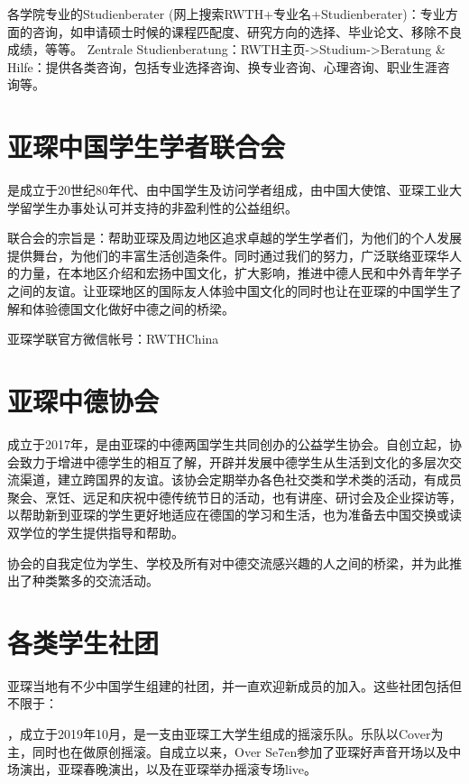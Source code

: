 各学院专业的Studienberater (网上搜索RWTH+专业名+Studienberater)：专业方面的咨询，如申请硕士时候的课程匹配度、研究方向的选择、毕业论文、移除不良成绩，等等。
Zentrale Studienberatung：RWTH主页->Studium->Beratung \& Hilfe：提供各类咨询，包括专业选择咨询、换专业咨询、心理咨询、职业生涯咨询等。

\section{亚琛中国学生学者联合会}

\href{http://www.vcwsa.rwth-aachen.de/}{}是成立于20世纪80年代、由中国学生及访问学者组成，由中国大使馆、亚琛工业大学留学生办事处认可并支持的非盈利性的公益组织。

联合会的宗旨是：帮助亚琛及周边地区追求卓越的学生学者们，为他们的个人发展提供舞台，为他们的丰富生活创造条件。同时通过我们的努力，广泛联络亚琛华人的力量，在本地区介绍和宏扬中国文化，扩大影响，推进中德人民和中外青年学子之间的友谊。让亚琛地区的国际友人体验中国文化的同时也让在亚琛的中国学生了解和体验德国文化做好中德之间的桥梁。

亚琛学联官方微信帐号：RWTHChina

\section{亚琛中德协会}

\href{https://www.cg-society.com/en/}{}成立于2017年，是由亚琛的中德两国学生共同创办的公益学生协会。自创立起，协会致力于增进中德学生的相互了解，开辟并发展中德学生从生活到文化的多层次交流渠道，建立跨国界的友谊。该协会定期举办各色社交类和学术类的活动，有成员聚会、烹饪、远足和庆祝中德传统节日的活动，也有讲座、研讨会及企业探访等，以帮助新到亚琛的学生更好地适应在德国的学习和生活，也为准备去中国交换或读双学位的学生提供指导和帮助。

协会的自我定位为学生、学校及所有对中德交流感兴趣的人之间的桥梁，并为此推出了种类繁多的交流活动。

\section{各类学生社团}

亚琛当地有不少中国学生组建的社团，并一直欢迎新成员的加入。这些社团包括但不限于：

，成立于2019年10月，是一支由亚琛工大学生组成的摇滚乐队。乐队以Cover为主，同时也在做原创摇滚。自成立以来，Over Se7en参加了亚琛好声音开场以及中场演出，亚琛春晚演出，以及在亚琛举办摇滚专场live。

